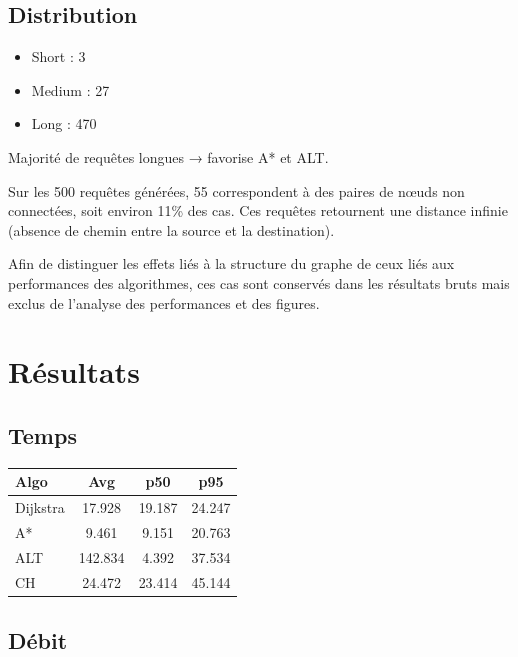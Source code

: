 \documentclass[11pt]{article}
\begin{document}
\subsection{Distribution}

\begin{itemize}
\item Short : 3
\item Medium : 27
\item Long : 470
\end{itemize}

Majorité de requêtes longues → favorise A* et ALT.

\medskip

Sur les 500 requêtes générées, 55 correspondent à des paires de nœuds non connectées, soit environ 11\% des cas.  
Ces requêtes retournent une distance infinie (absence de chemin entre la source et la destination).

\medskip

Afin de distinguer les effets liés à la structure du graphe de ceux liés aux performances des algorithmes, ces cas sont conservés dans les résultats bruts mais exclus de l’analyse des performances et des figures.


\section{Résultats}

\subsection{Temps}

{\large
\renewcommand{\arraystretch}{1.2}
\begin{center}
\begin{tabular}{lccc}
\hline
Algo & Avg & p50 & p95 \\
\hline
Dijkstra & 17.928 & 19.187 & 24.247 \\
A* & 9.461 & 9.151 & 20.763 \\
ALT & 142.834 & 4.392 & 37.534 \\
CH & 24.472 & 23.414 & 45.144 \\
\hline
\end{tabular}
\end{center}
}

\subsection{Débit}
\end{document}
